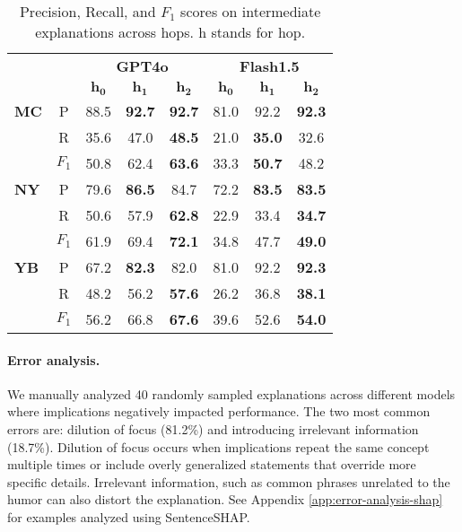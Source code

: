 \begin{table}[h]
\small
\centering
\begin{tabular}{lc|ccc|ccc} %
\toprule
& & \multicolumn{3}{c|}{\textbf{GPT4o}} & \multicolumn{3}{c}{\textbf{Flash1.5}} \\
 & \textbf{} & $\mathbf{h_{0}}$ & $\mathbf{h_{1}}$ & $\mathbf{h_{2}}$ & $\mathbf{h_{0}}$ & $\mathbf{h_{1}}$ & $\mathbf{h_{2}}$ \\
\midrule
\textbf{MC} & P & 88.5 & \textbf{92.7} & \textbf{92.7} & 81.0 & 92.2 & \textbf{92.3} \\
  & R & 35.6 & 47.0 & \textbf{48.5} & 21.0 & \textbf{35.0} & 32.6\\
 & $F_1$ & 50.8 & 62.4 & \textbf{63.6} & 33.3 & \textbf{50.7} & 48.2\\
\midrule
\textbf{NY} & P & 79.6 & \textbf{86.5} & 84.7 & 72.2 & \textbf{83.5} & \textbf{83.5}\\
 & R & 50.6 & 57.9 & \textbf{62.8} & 22.9 & 33.4 & \textbf{34.7} \\
 & $F_1$ & 61.9 & 69.4 & \textbf{72.1} & 34.8 & 47.7 & \textbf{49.0} \\
\midrule
\textbf{YB} & P & 67.2 & \textbf{82.3} & 82.0  & 81.0 & 92.2 & \textbf{92.3} \\
 & R & 48.2 & 56.2 & \textbf{57.6} & 26.2 & 36.8 & \textbf{38.1} \\
 & $F_1$ & 56.2 & 66.8 & \textbf{67.6} & 39.6 & 52.6 & \textbf{54.0}\\
\bottomrule
\end{tabular}
\caption{Precision, Recall, and $F_1$ scores on intermediate explanations across hops. h stands for hop.}
\label{tab:hop-analysis}
\vspace{-10pt}
\end{table}



\paragraph{Error analysis.} 
\label{sec:results:rq4}
We manually analyzed 40 randomly sampled explanations across different models where implications negatively impacted performance. The two most common errors are: dilution of focus (81.2\%) and introducing irrelevant information (18.7\%).
Dilution of focus occurs when implications repeat the same concept multiple times or include overly generalized statements that override more specific details. Irrelevant information, such as common phrases unrelated to the humor can also distort the explanation. See Appendix \ref{app:error-analysis-shap} for examples analyzed using SentenceSHAP.
